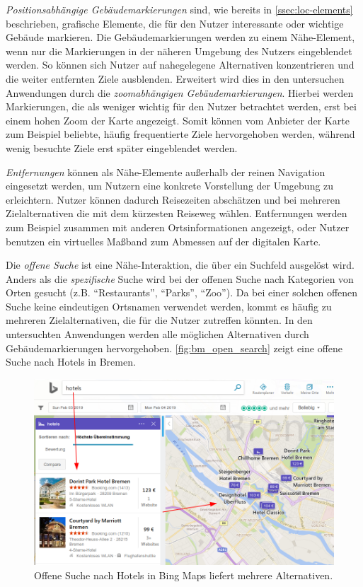 \emph{Positionsabhängige Gebäudemarkierungen} sind, wie bereits in \autoref{ssec:loc-elements} beschrieben, grafische Elemente, die für den Nutzer interessante oder wichtige Gebäude markieren.
Die Gebäudemarkierungen werden zu einem Nähe-Element, wenn nur die Markierungen in der näheren Umgebung des Nutzers eingeblendet werden.
So können sich Nutzer auf nahegelegene Alternativen konzentrieren und die weiter entfernten Ziele ausblenden.
Erweitert wird dies in den untersuchen Anwendungen durch die \emph{zoomabhängigen Gebäudemarkierungen}.
Hierbei werden Markierungen, die als weniger wichtig für den Nutzer betrachtet werden, erst bei einem hohen Zoom der Karte angezeigt.
Somit können vom Anbieter der Karte zum Beispiel beliebte, häufig frequentierte Ziele hervorgehoben werden, während wenig besuchte Ziele erst später eingeblendet werden.

\emph{Entfernungen} können als Nähe-Elemente außerhalb der reinen Navigation eingesetzt werden, um Nutzern eine konkrete Vorstellung der Umgebung zu erleichtern.
Nutzer können dadurch Reisezeiten abschätzen und bei mehreren Zielalternativen die mit dem kürzesten Reiseweg wählen.
Entfernungen werden zum Beispiel zusammen mit anderen Ortsinformationen angezeigt, oder Nutzer benutzen ein virtuelles Maßband zum Abmessen auf der digitalen Karte.

Die \emph{offene Suche} ist eine Nähe-Interaktion, die über ein Suchfeld ausgelöst wird.
Anders als die \emph{spezifische} Suche wird bei der offenen Suche nach Kategorien von Orten gesucht (z.B. \enquote{Restaurants}, \enquote{Parks}, \enquote{Zoo}).
Da bei einer solchen offenen Suche keine eindeutigen Ortsnamen verwendet werden, kommt es häufig zu mehreren Zielalternativen, die für die Nutzer zutreffen könnten.
In den untersuchten Anwendungen werden alle möglichen Alternativen durch Gebäudemarkierungen hervorgehoben.
\autoref{fig:bm_open_search} zeigt eine offene Suche nach Hotels in Bremen.
\begin{figure}[h]
	\includegraphics[width=\linewidth]{figures/map-app_examples/bm_open_search_2}
	\caption{Offene Suche nach Hotels in Bing Maps liefert mehrere Alternativen.}
	\label{fig:bm_open_search}
\end{figure}

